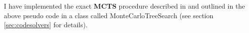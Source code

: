 I have implemented the exact \textbf{MCTS} procedure described in \cite{https://doi.org/10.48550/arxiv.1805.07470} and outlined in the above pseudo code in  a class called MonteCarloTreeSearch (see section \ref{sec:codesolvers} for details).




































